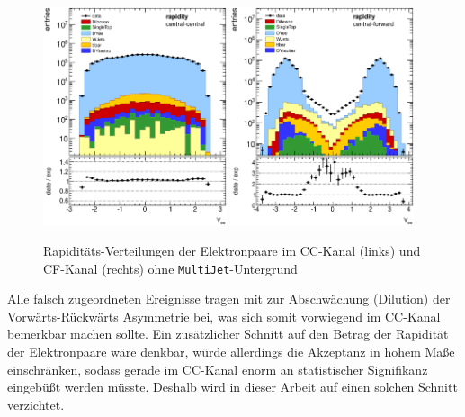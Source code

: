 \begin{figure}[h]
    \centering
    \includegraphics[width=0.48\textwidth]{plots/yee_cc}
    \hfill
    \includegraphics[width=0.48\textwidth]{plots/yee_cf}
    \caption[Rapiditäts-Verteilungen der Elektronpaare im \ac{CC}-Kanal
        und \ac{CF}-Kanal]
        {Rapiditäts-Verteilungen der Elektronpaare im \ac{CC}-Kanal
        (links) und \ac{CF}-Kanal (rechts) ohne \texttt{MultiJet}-Untergrund}
    \label{fig:rapidities}
\end{figure}

Alle falsch zugeordneten Ereignisse tragen mit zur Abschwächung (Dilution) der
Vorwärts-Rückwärts Asymmetrie bei, was sich somit vorwiegend im \ac{CC}-Kanal
bemerkbar machen sollte. Ein zusätzlicher Schnitt auf den Betrag der Rapidität
der Elektronpaare wäre denkbar, würde allerdings die Akzeptanz in hohem Maße
einschränken, sodass gerade im \ac{CC}-Kanal enorm an statistischer Signifikanz 
eingebüßt werden müsste. Deshalb wird in dieser Arbeit auf einen solchen
Schnitt verzichtet.



